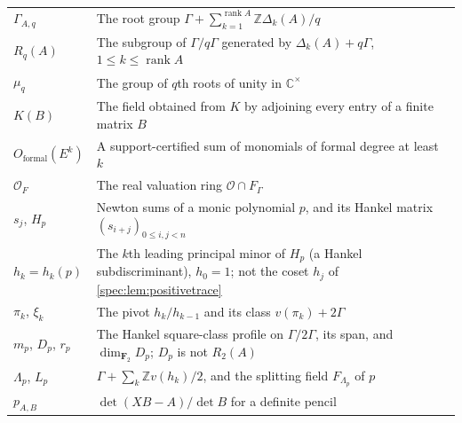 \documentclass[11pt,a4paper]{article}
\numberwithin{equation}{section}
\theoremstyle{definition}
\theoremstyle{remark}
\newcommand{\C}{\mathbb C}
\newcommand{\Z}{\mathbb Z}
\newcommand{\OO}{\mathcal O}
\newcommand{\rank}{\operatorname{rank}}
\begin{document}
\begin{longtable}{@{}P{.27\textwidth}P{.67\textwidth}@{}}
$\Gamma_{A,q}$ & The root group $\Gamma+\sum_{k=1}^{\rank A}\Z\Delta_k(A)/q$\\
$R_q(A)$ & The subgroup of $\Gamma/q\Gamma$ generated by $\Delta_k(A)+q\Gamma$, $1\le k\le\rank A$\\
$\mu_q$ & The group of $q$th roots of unity in $\C^\times$\\
$K(B)$ & The field obtained from $K$ by adjoining every entry of a finite matrix $B$\\
$O_{\mathrm{formal}}(E^k)$ & A support-certified sum of monomials of formal degree at least $k$\\
\addlinespace
$\OO_F$ & The real valuation ring $\OO\cap F_\Gamma$\\
$s_j$, $H_p$ & Newton sums of a monic polynomial $p$, and its Hankel matrix $(s_{i+j})_{0\le i,j<n}$\\
$h_k=h_k(p)$ & The $k$th leading principal minor of $H_p$ (a Hankel subdiscriminant), $h_0=1$; not the coset $h_j$ of \cref{spec:lem:positivetrace}\\
$\pi_k$, $\xi_k$ & The pivot $h_k/h_{k-1}$ and its class $v(\pi_k)+2\Gamma$\\
$m_p$, $D_p$, $r_p$ & The Hankel square-class profile on $\Gamma/2\Gamma$, its span, and $\dim_{\mathbf F_2}D_p$; $D_p$ is not $R_2(A)$\\
$\Lambda_p$, $L_p$ & $\Gamma+\sum_k\Z v(h_k)/2$, and the splitting field $F_{\Lambda_p}$ of $p$\\
$p_{A,B}$ & $\det(XB-A)/\det B$ for a definite pencil\\
\bottomrule
\end{longtable}
\end{document}
